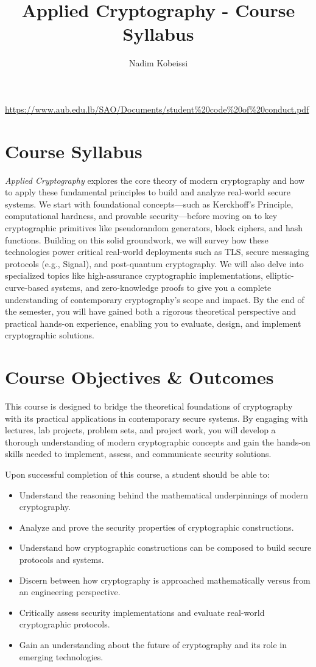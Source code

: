\documentclass[10pt,a4paper,american]{exam}
\title{Applied Cryptography - Course Syllabus}
\author{Nadim Kobeissi}
\begin{document}
\classhandoutheader
\urldef{\urlcodeofconduct}\url{https://www.aub.edu.lb/SAO/Documents/student%20code%20of%20conduct.pdf}
\section*{Course Syllabus}

\textit{Applied Cryptography} explores the core theory of modern cryptography and how to apply these fundamental principles to build and analyze real-world secure systems. We start with foundational concepts—such as Kerckhoff's Principle, computational hardness, and provable security—before moving on to key cryptographic primitives like pseudorandom generators, block ciphers, and hash functions. Building on this solid groundwork, we will survey how these technologies power critical real-world deployments such as TLS, secure messaging protocols (e.g., Signal), and post-quantum cryptography. We will also delve into specialized topics like high-assurance cryptographic implementations, elliptic-curve-based systems, and zero-knowledge proofs to give you a complete understanding of contemporary cryptography's scope and impact. By the end of the semester, you will have gained both a rigorous theoretical perspective and practical hands-on experience, enabling you to evaluate, design, and implement cryptographic solutions.

\section{Course Objectives \& Outcomes}
This course is designed to bridge the theoretical foundations of cryptography with its practical applications in contemporary secure systems. By engaging with lectures, lab projects, problem sets, and project work, you will develop a thorough understanding of modern cryptographic concepts and gain the hands-on skills needed to implement, assess, and communicate security solutions.

Upon successful completion of this course, a student should be able to:

\begin{itemize}
	\item Understand the reasoning behind the mathematical underpinnings of modern cryptography.
	\item Analyze and prove the security properties of cryptographic constructions.
	\item Understand how cryptographic constructions can be composed to build secure protocols and systems.
	\item Discern between how cryptography is approached mathematically versus from an engineering perspective.
	\item Critically assess security implementations and evaluate real-world cryptographic protocols.
	\item Gain an understanding about the future of cryptography and its role in emerging technologies.
\end{itemize}
\end{document}
